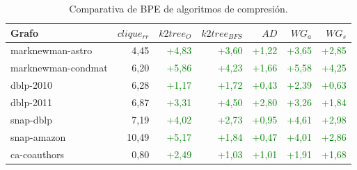 \begin{table}
	\caption{Comparativa de BPE de algoritmos de compresión.}
	\label{table:BPEcompDiff}
	\centering
	\begin{tabular}{l|r|r|r|r|r|r}
		\toprule
		Grafo & $clique_{rr}$ & $k2tree_{O}$ & $k2tree_{BFS}$ & $AD$ & $WG_{a}$ & $WG_{s}$\\
		\midrule
		marknewman-astro & 4,45 & \textcolor{Green}{+4,83} & \textcolor{Green}{+3,60} & \textcolor{Green}{+1,22} & \textcolor{Green}{+3,65} & \textcolor{Green}{+2,85} \\
		marknewman-condmat & 6,20 & \textcolor{Green}{+5,86} & \textcolor{Green}{+4,23} & \textcolor{Green}{+1,66} & \textcolor{Green}{+5,58} & \textcolor{Green}{+4,25} \\
		dblp-2010 & 6,28 & \textcolor{Green}{+1,17} & \textcolor{Green}{+1,72} & \textcolor{Green}{+0,43} & \textcolor{Green}{+2,39} & \textcolor{Green}{+0,63} \\
		dblp-2011 & 6,87 & \textcolor{Green}{+3,31} & \textcolor{Green}{+4,50} & \textcolor{Green}{+2,80} & \textcolor{Green}{+3,26} & \textcolor{Green}{+1,84} \\
		snap-dblp & 7,19 & \textcolor{Green}{+4,02} & \textcolor{Green}{+2,73} & \textcolor{Green}{+0,95} & \textcolor{Green}{+4,61} & \textcolor{Green}{+2,98} \\
		snap-amazon & 10,49 & \textcolor{Green}{+5,17} & \textcolor{Green}{+1,84} & \textcolor{Green}{+0,47} & \textcolor{Green}{+4,01} & \textcolor{Green}{+2,86} \\
		ca-coauthors & 0,80 & \textcolor{Green}{+2,49} & \textcolor{Green}{+1,03} & \textcolor{Green}{+1,01} & \textcolor{Green}{+1,91} & \textcolor{Green}{+1,68} \\
		\bottomrule
	\end{tabular}
\end{table}
